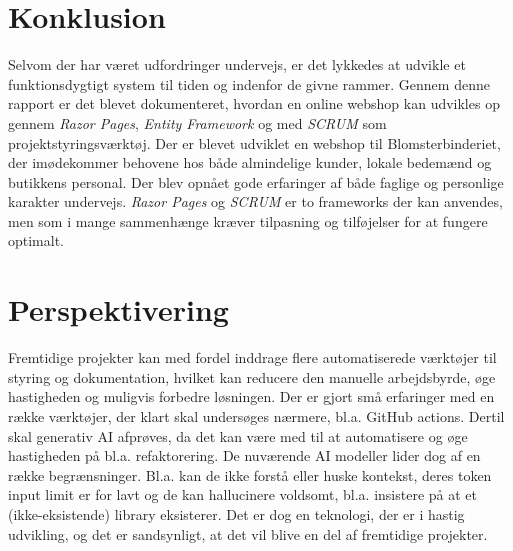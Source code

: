 \section{Konklusion}
\label{sec:conclusion_conclusion}
Selvom der har været udfordringer undervejs, er det lykkedes at udvikle et funktionsdygtigt system til tiden og indenfor de givne rammer.
Gennem denne rapport er det blevet dokumenteret, hvordan en online webshop kan udvikles op gennem \emph{Razor Pages}, \emph{Entity Framework} og med \emph{SCRUM} som projektstyringsværktøj.
Der er blevet udviklet en webshop til Blomsterbinderiet, der imødekommer behovene hos både almindelige kunder, lokale bedemænd og butikkens personal.
Der blev opnået gode erfaringer af både faglige og personlige karakter undervejs. \emph{Razor Pages} og \emph{SCRUM} er to frameworks der kan anvendes, men som i mange sammenhænge kræver tilpasning og tilføjelser for at fungere optimalt.

\section{Perspektivering}
\label{sec:conclusion_perspective}
Fremtidige projekter kan med fordel inddrage flere automatiserede værktøjer til styring og dokumentation, hvilket kan reducere den manuelle arbejdsbyrde, øge hastigheden og muligvis forbedre løsningen.
Der er gjort små erfaringer med en række værktøjer, der klart skal undersøges nærmere, bl.a. GitHub actions.
Dertil skal generativ AI afprøves, da det kan være med til at automatisere og øge hastigheden på bl.a. refaktorering. 
De nuværende AI modeller lider dog af en række begrænsninger. Bl.a. kan de ikke forstå eller huske kontekst, deres token input limit er for lavt og de kan hallucinere voldsomt, bl.a. insistere på at et (ikke-eksistende) library eksisterer.
Det er dog en teknologi, der er i hastig udvikling, og det er sandsynligt, at det vil blive en del af fremtidige projekter. 